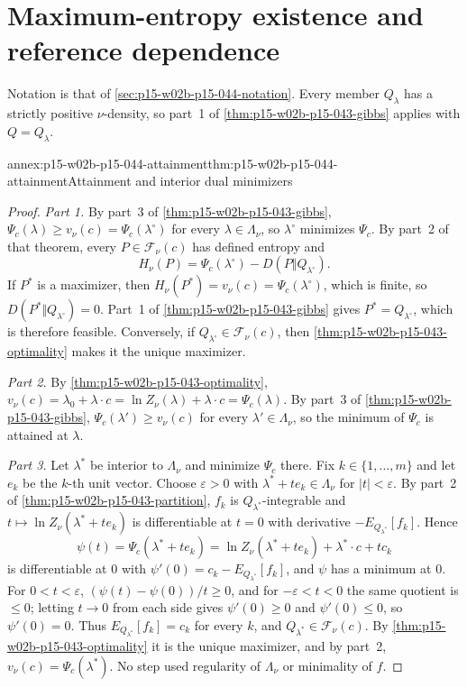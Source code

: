 \section{Maximum-entropy existence and reference dependence}
\label{sec:annex-p15-w02b-p15-044-maxent-existence}

Notation is that of \cref{sec:p15-w02b-p15-044-notation}. Every member
\(Q_\lambda\) has a strictly positive \(\nu\)-density, so part~1 of
\cref{thm:p15-w02b-p15-043-gibbs} applies with \(Q=Q_\lambda\).

\begin{annexitem}{annex:p15-w02b-p15-044-attainment}{thm:p15-w02b-p15-044-attainment}{Attainment and interior dual minimizers}
\begin{proof}
\emph{Part 1.} By part~3 of \cref{thm:p15-w02b-p15-043-gibbs},
\(\Psi_c(\lambda)\geq v_\nu(c)=\Psi_c(\lambda^\circ)\) for every
\(\lambda\in\Lambda_\nu\), so \(\lambda^\circ\) minimizes \(\Psi_c\). By
part~2 of that theorem, every \(P\in\mathcal F_\nu(c)\) has defined entropy
and
\[
 H_\nu(P)=\Psi_c(\lambda^\circ)-D(P\Vert Q_{\lambda^\circ}) .
\]
If \(P^*\) is a maximizer, then \(H_\nu(P^*)=v_\nu(c)=\Psi_c(\lambda^\circ)\),
which is finite, so \(D(P^*\Vert Q_{\lambda^\circ})=0\). Part~1 of
\cref{thm:p15-w02b-p15-043-gibbs} gives \(P^*=Q_{\lambda^\circ}\), which is
therefore feasible. Conversely, if \(Q_{\lambda^\circ}\in\mathcal F_\nu(c)\),
then \cref{thm:p15-w02b-p15-043-optimality} makes it the unique maximizer.

\emph{Part 2.} By \cref{thm:p15-w02b-p15-043-optimality},
\(v_\nu(c)=\lambda_0+\lambda\cdot c=\ln Z_\nu(\lambda)+\lambda\cdot c=\Psi_c(\lambda)\).
By part~3 of \cref{thm:p15-w02b-p15-043-gibbs},
\(\Psi_c(\lambda')\geq v_\nu(c)\) for every \(\lambda'\in\Lambda_\nu\), so the
minimum of \(\Psi_c\) is attained at \(\lambda\).

\emph{Part 3.} Let \(\lambda^*\) be interior to \(\Lambda_\nu\) and minimize
\(\Psi_c\) there. Fix \(k\in\{1,\dots,m\}\) and let \(e_k\) be the \(k\)-th
unit vector. Choose \(\varepsilon>0\) with \(\lambda^*+te_k\in\Lambda_\nu\)
for \(|t|<\varepsilon\). By part~2 of \cref{thm:p15-w02b-p15-043-partition},
\(f_k\) is \(Q_{\lambda^*}\)-integrable and \(t\mapsto\ln Z_\nu(\lambda^*+te_k)\)
is differentiable at \(t=0\) with derivative \(-E_{Q_{\lambda^*}}[f_k]\). Hence
\[
 \psi(t)=\Psi_c(\lambda^*+te_k)=\ln Z_\nu(\lambda^*+te_k)+\lambda^*\cdot c+tc_k
\]
is differentiable at \(0\) with \(\psi'(0)=c_k-E_{Q_{\lambda^*}}[f_k]\), and
\(\psi\) has a minimum at \(0\). For \(0<t<\varepsilon\),
\((\psi(t)-\psi(0))/t\geq0\), and for \(-\varepsilon<t<0\) the same quotient
is \(\leq0\); letting \(t\to0\) from each side gives \(\psi'(0)\geq0\) and
\(\psi'(0)\leq0\), so \(\psi'(0)=0\). Thus \(E_{Q_{\lambda^*}}[f_k]=c_k\) for
every \(k\), and \(Q_{\lambda^*}\in\mathcal F_\nu(c)\). By
\cref{thm:p15-w02b-p15-043-optimality} it is the unique maximizer, and by
part~2, \(v_\nu(c)=\Psi_c(\lambda^*)\). No step used regularity of
\(\Lambda_\nu\) or minimality of \(f\).
\end{proof}
\end{annexitem}


